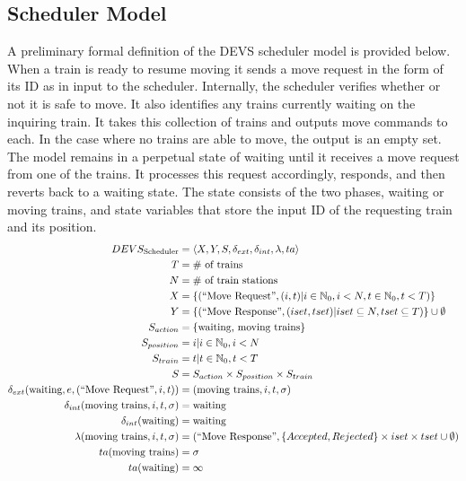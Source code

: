 \subsection{Scheduler Model}
A preliminary formal definition of the DEVS scheduler model is provided below. When a train is ready to resume moving it sends a move request in the form of its ID as in input to the scheduler.  Internally, the scheduler verifies whether or not it is safe to move.  It also identifies any trains currently waiting on the inquiring train.  It takes this collection of trains and outputs move commands to each.  In the case where no trains are able to move, the output is an empty set. The model remains in a perpetual state of waiting until it receives a move request from one of the trains.  It processes this request accordingly, responds, and then reverts back to a waiting state. The state consists of the two phases, waiting or moving trains, and state variables that store the input ID of the requesting train and its position.
\begin{align*} DEVS_{\textrm{Scheduler}} &= \left<X,Y,S,\delta_{ext},\delta_{int},\lambda,ta\right> \\
T &= \# \text{ of trains} \\
N &= \# \text{ of train stations} \\
X &= \lbrace(\text{``Move Request''}, (i,t)|i\in\mathbb{N}_0,i<N, t\in\mathbb{N}_0,t<T)\rbrace \\
Y &= \lbrace(\text{``Move Response''}, (iset,tset)|iset\subseteq N, tset\subseteq T)\rbrace \cup\emptyset \\
S_{action} &= \lbrace \text{waiting, moving trains}\rbrace \\
S_{position} &= {i|i\in\mathbb{N}_0, i<N} \\
S_{train} &= {t|t\in\mathbb{N}_0, t<T} \\
S &= S_{action}\times S_{position}\times S_{train} \\
\delta_{ext}(\text{waiting},e,(\text{``Move Request''},i,t)) &= (\text{moving trains},i,t,\sigma) \\
\delta_{int}(\text{moving trains},i,t,\sigma) &= \text{waiting} \\
\delta_{int}(\text{waiting}) &= \text{waiting} \\
\lambda(\text{moving trains},i,t,\sigma) &= (\text{``Move Response''},\lbrace Accepted, Rejected\rbrace\times iset\times tset\cup \emptyset)\\
ta(\text{moving trains}) &= \sigma \\ 
ta(\text{waiting}) &= \infty \\
\end{align*}

